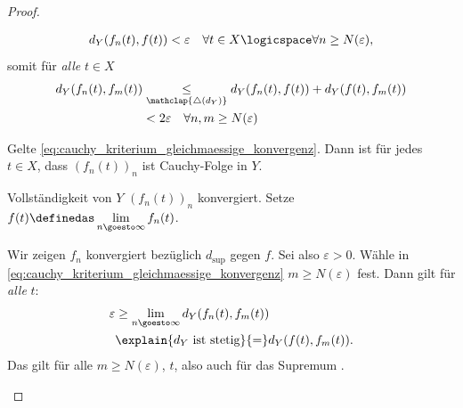\begin{lemma}
\begin{eigenschaftenenumerate}
\begin{proof}
\begin{proofdescription}
\begin{align*}
                    d_Y(f_n(t),f(t))<\varepsilon\quad \forall t\in X\logicspace \forall n\geq N(\varepsilon),
                \end{align*} 
                somit für \emph{alle} \( t\in X\)
                \begin{align*}
                    d_Y(f_n(t),f_m(t))\begin{aligned}[t]
                        &\underset{\mathclap{\triangle(d_Y)}}{\leq} d_Y(f_n(t),f(t))+d_Y(f(t),f_m(t))\\
                        &<2\varepsilon \quad \forall n,m\geq N(\varepsilon)
                    \end{aligned}
                \end{align*} 
                \item[\rueck] Gelte \eqref{eq:cauchy_kriterium_gleichmaessige_konvergenz}. Dann ist für jedes \( t\in X\), dass \( (f_n(t))_n\) ist Cauchy-Folge in \( Y\).  
                
                Vollständigkeit von \( Y\) \timplies \( (f_n(t))_n\) konvergiert. Setze \( f(t)\definedas \lim\limits_{n \goesto \infty} f_n(t)\).
                
                Wir zeigen \( f_n\) konvergiert bezüglich \( d_{\sup}\) gegen \( f\). Sei also \( \varepsilon>0\). Wähle in \eqref{eq:cauchy_kriterium_gleichmaessige_konvergenz} \( m\geq N(\varepsilon)\) fest. Dann gilt für \emph{alle} \( t\):
                \begin{align*}
                    \varepsilon \begin{aligned}[t]
                        &\geq \lim\limits_{n \goesto \infty} d_Y(f_n(t),f_m(t))\\
                        &\explain{d_Y\text{ ist stetig}}{=} d_Y(f(t),f_m(t)).
                    \end{aligned}
                \end{align*}
                Das gilt für alle \( m\geq N(\varepsilon)\), \tforall \( t\), also auch für das Supremum \timplies \Beh.
            \end{proofdescription}
            

\end{proof}
\end{eigenschaftenenumerate}
\end{lemma}
